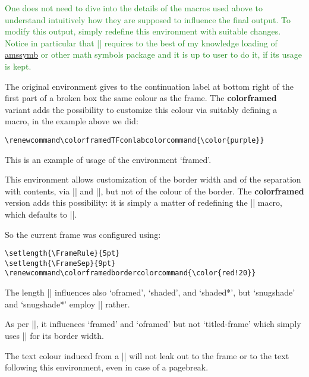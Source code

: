 \documentclass[a4paper,dvipdfmx,11pt]{article}
\def\colorframedTFconlabcolorcommand{\color{purple}}
\def\colorframedbordercolorcommand{\color{red!20}}
\def\ctanpackage#1{\href{https://ctan.org/pkg/#1}{#1}}
\newcommand\colorframed{%
        \texorpdfstring{{\color{joli}\bfseries colorframed}}{colorframed}\xspace}
\begin{document}
\begin{snugshade*}\textcolor{ForestGreen}{%
  One does not need to dive into the details of the macros
  used above to understand intuitively how they are supposed
  to influence the final output.  To modify this output,
  simply redefine this environment with suitable changes.
  Notice in particular that \expandafter|\string\blacktriangleright| requires to
  the best of my knowledge loading of \ctanpackage{amssymb} or
  other math symbols package and it is up to user to do it, if
  its usage is kept.}

The original environment gives to the continuation label at
bottom right of the first part of a broken box the same colour
as the frame.  The \colorframed variant adds the possibility
to customize this colour via suitably defining a macro, in the
example above we did:
\begin{verbatim}
\renewcommand\colorframedTFconlabcolorcommand{\color{purple}}
\end{verbatim}
\end{snugshade*}

\begin{framed}
  This is an example of usage of the environment `framed'.

  This environment allows customization of the border width
  and of the separation with contents, via |\FrameRule| and
  |\FrameSep|, but not of the colour of the border.  The
  \colorframed version adds this possibility: it is simply a
  matter of redefining the |\colorframedbordercolorcommand|
  macro, which defaults to |\normalcolor|.

\color{blue}
  So the current frame was configured using:
\begin{verbatim}
\setlength{\FrameRule}{5pt}
\setlength{\FrameSep}{9pt}
\renewcommand\colorframedbordercolorcommand{\color{red!20}}
\end{verbatim}
\begin{footnotesize}\normalcolor
  The length |\FrameSep| influences also `oframed', `shaded', and `shaded*',
  but `snugshade' and `snugshade*' employ |\fboxsep| rather.

  As per |\FrameRule|, it influences `framed' and `oframed' but not
  `titled-frame' which simply uses |\fboxrule| for its border width.\par
\end{footnotesize}
  The text colour induced from a |\color{blue}|
  will not leak out to the frame or to the text following this
  environment, even in case of a pagebreak.
\end{framed}
\end{document}
